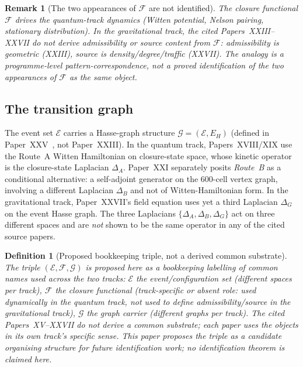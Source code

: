 \documentclass[12pt]{article}
\newtheorem{definition}[theorem]{Definition}
\newtheorem{remark}[theorem]{Remark}
\newcommand{\Ecal}{\mathcal{E}}
\newcommand{\Gcal}{\mathcal{G}}
\newcommand{\Fcal}{\mathcal{F}}
\begin{document}
\begin{remark}[The two appearances of $\Fcal$ are not identified]
The closure functional $\Fcal$ drives the quantum-track dynamics (Witten potential, Nelson pairing, stationary distribution). In the gravitational track, the cited Papers~XXIII--XXVII do \emph{not} derive admissibility or source content from $\Fcal$: admissibility is geometric (XXIII), source is density/degree/traffic (XXVII). The analogy is a programme-level pattern-correspondence, not a proved identification of the two appearances of $\Fcal$ as the same object.
\end{remark}

\subsection{The transition graph}

The event set $\Ecal$ carries a Hasse-graph structure $\Gcal = (\Ecal, E_H)$ (defined in Paper~XXV~\citep{SmartXXV}, not Paper~XXIII). In the quantum track, Papers~XVIII/XIX use the Route~A Witten Hamiltonian on closure-state space, whose kinetic operator is the closure-state Laplacian $\Delta_A$. Paper~XXI separately posits \emph{Route~B} as a conditional alternative: a self-adjoint generator on the 600-cell vertex graph, involving a different Laplacian $\Delta_B$ and not of Witten-Hamiltonian form. In the gravitational track, Paper~XXVII's field equation uses yet a third Laplacian $\Delta_G$ on the event Hasse graph. The three Laplacians $\{\Delta_A, \Delta_B, \Delta_G\}$ act on three different spaces and are \emph{not} shown to be the same operator in any of the cited source papers.

\begin{definition}[Proposed bookkeeping triple, not a derived common substrate]\label{def:substrate}
The triple $(\Ecal, \Fcal, \Gcal)$ is proposed here as a \emph{bookkeeping labelling} of common names used across the two tracks: $\Ecal$ the event/configuration set (different spaces per track), $\Fcal$ the closure functional (track-specific or absent role: used dynamically in the quantum track, not used to define admissibility/source in the gravitational track), $\Gcal$ the graph carrier (different graphs per track). The cited Papers~XV--XXVII do \emph{not} derive a common substrate; each paper uses the objects in its own track's specific sense. This paper proposes the triple as a candidate organising structure for future identification work; no identification theorem is claimed here.
\end{definition}
\end{document}
